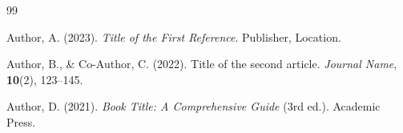 \cleardoublepage
{}
{}

%   
%   

\begin{thebibliography}{99}

    Author, A. (2023).
    \textit{Title of the First Reference}.
    Publisher, Location.

    Author, B., \& Co-Author, C. (2022).
    Title of the second article.
    \textit{Journal Name}, \textbf{10}(2), 123--145.

    Author, D. (2021).
    \textit{Book Title: A Comprehensive Guide} (3rd ed.).
    Academic Press.

\end{thebibliography}
